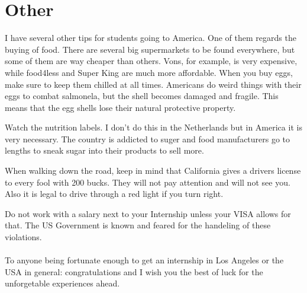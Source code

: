 \documentclass{article}
\begin{document}
\section{Other}
I have several other tips for students going to America. One of them regards the buying of food. There are several big supermarkets to be found everywhere, but some of them are way cheaper than others. Vons, for example, is very expensive, while food4less and Super King are much more affordable. When you buy eggs, make sure to keep them chilled at all times. Americans do weird things with their eggs to combat salmonela, but the shell becomes damaged and fragile. This means that the egg shells lose their natural protective property.

Watch the nutrition labels. I don't do this in the Netherlands but in America it is very necessary. The country is addicted to suger and food manufacturers go to lengths to sneak sugar into their products to sell more.

When walking down the road, keep in mind that California gives a drivers license to every fool with 200 bucks. They will not pay attention and will not see you. Also it is legal to drive through a red light if you turn right. 

Do not work with a salary next to your Internship unless your VISA allows for that. The US Government is known and feared for the handeling of these violations. \\ 
\\
To anyone being fortunate enough to get an internship in Los Angeles or the USA in general: congratulations and I wish you the best of luck for the unforgetable experiences ahead.
\end{document}
